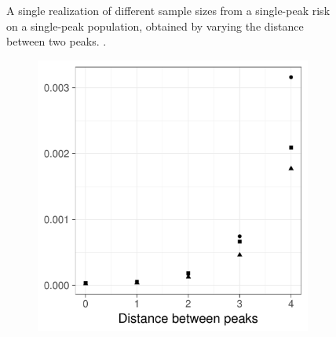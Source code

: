 \begin{figure}[htbp]
\begin{subfigure}{0.45\textwidth}
        \label{fig:one_sample:p1.4_100_Gap_risk:4}
    \end{subfigure}
    \caption[Examples showing distance between population and incident peaks]
        {A single realization of different sample sizes from a single-peak risk on a single-peak population, obtained by varying the distance between two peaks. \scatterplotcaption.}
    \label{fig:one_sample:p1.4_100_Gap_risk}
\end{figure}

\begin{figure}[htbp]
    \centering
    \begin{subfigure}[b]{0.49\textwidth}
        \includegraphics[width=\textwidth]{results/by_pop_risk_distance/MISE-vs-population-risk-gap}
        \caption{}
        \label{fig:ise:p1.4_100_Gap_risk:mise}
    \end{subfigure}
    \begin{subfigure}[b]{0.49\textwidth}

\end{subfigure}
\end{figure}
